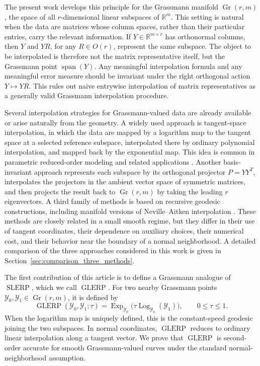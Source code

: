 \documentclass[a4paper,11pt]{article}
\newcommand{\bR}{\mathbb{R}}
\newcommand{\Log}{\operatorname{Log}}
\newcommand{\Exp}{\operatorname{Exp}}
\newcommand{\SLERP}{\operatorname{SLERP}}
\DeclareMathOperator{\Gr}{Gr}
\DeclareMathOperator{\spanop}{span}
\newcommand{\GLERP}{\operatorname{GLERP}}
\numberwithin{equation}{section}
\theoremstyle{plain}
\theoremstyle{definition}
\theoremstyle{remark}
\begin{document}
The present work develops this principle for the Grassmann manifold \(\Gr(r,m)\), the space of all \(r\)-dimensional linear subspaces of \(\bR^m\).  This setting is natural when the data are matrices whose column spaces, rather than their particular entries, carry the relevant information.  If \(Y\in\bR^{m\times r}\) has orthonormal columns, then \(Y\) and \(YR\), for any \(R\in O(r)\), represent the same subspace.  The object to be interpolated is therefore not the matrix representative itself, but the Grassmann point \(\spanop(Y)\).  Any meaningful interpolation formula and any meaningful error measure should be invariant under the right orthogonal action \(Y\mapsto YR\).  This rules out naive entrywise interpolation of matrix representatives as a generally valid Grassmann interpolation procedure.

Several interpolation strategies for Grassmann-valued data are already available or arise naturally from the geometry.  A widely used approach is tangent-space interpolation, in which the data are mapped by a logarithm map to the tangent space at a selected reference subspace, interpolated there by ordinary polynomial interpolation, and mapped back by the exponential map.  This idea is common in parametric reduced-order modeling and related applications \cite{AmsallemFarhat2011}.  Another basis-invariant approach represents each subspace by its orthogonal projector \(P=YY^T\), interpolates the projectors in the ambient vector space of symmetric matrices, and then projects the result back to \(\Gr(r,m)\) by taking the leading \(r\) eigenvectors.  A third family of methods is based on recursive geodesic constructions, including manifold versions of Neville--Aitken interpolation \cite{NoakesHeinzingerPaden1989,MosqueraEtAl2019}.  These methods are closely related in a small smooth regime, but they differ in their use of tangent coordinates, their dependence on auxiliary choices, their numerical cost, and their behavior near the boundary of a normal neighborhood.  A detailed comparison of the three approaches considered in this work is given in Section~\ref{sec:comparison_three_methods}.

The first contribution of this article is to define a Grassmann analogue of \(\SLERP\), which we call \(\GLERP\).  For two nearby Grassmann points \(\mathcal{Y}_0,\mathcal{Y}_1\in\Gr(r,m)\), it is defined by
\[
    \GLERP(\mathcal{Y}_0,\mathcal{Y}_1;\tau)
    =
    \Exp_{\mathcal{Y}_0}
    \bigl(
        \tau\Log_{\mathcal{Y}_0}(\mathcal{Y}_1)
    \bigr),
    \qquad 0\le \tau\le 1.
\]
When the logarithm map is uniquely defined, this is the constant-speed geodesic joining the two subspaces.  In normal coordinates, \(\GLERP\) reduces to ordinary linear interpolation along a tangent vector.  We prove that \(\GLERP\) is second-order accurate for smooth Grassmann-valued curves under the standard normal-neighborhood assumption.
\end{document}
